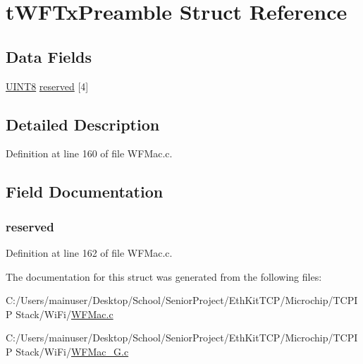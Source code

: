 \hypertarget{structt_w_f_tx_preamble}{}\section{t\+W\+F\+Tx\+Preamble Struct Reference}
\label{structt_w_f_tx_preamble}
\subsection*{Data Fields}
\begin{DoxyCompactItemize}
\item 
\hyperlink{_generic_type_defs_8h_ab27e9918b538ce9d8ca692479b375b6a}{U\+I\+N\+T8} \hyperlink{structt_w_f_tx_preamble_a990d26e96bfb188449f93656115b026a}{reserved} \mbox{[}4\mbox{]}
\end{DoxyCompactItemize}


\subsection{Detailed Description}


Definition at line 160 of file W\+F\+Mac.\+c.



\subsection{Field Documentation}
\hypertarget{structt_w_f_tx_preamble_a990d26e96bfb188449f93656115b026a}{}
\subsubsection[{reserved}]{ reserved}\label{structt_w_f_tx_preamble_a990d26e96bfb188449f93656115b026a}


Definition at line 162 of file W\+F\+Mac.\+c.



The documentation for this struct was generated from the following files\+:\begin{DoxyCompactItemize}
\item 
C\+:/\+Users/mainuser/\+Desktop/\+School/\+Senior\+Project/\+Eth\+Kit\+T\+C\+P/\+Microchip/\+T\+C\+P\+I\+P Stack/\+Wi\+Fi/\hyperlink{_w_f_mac_8c}{W\+F\+Mac.\+c}\item 
C\+:/\+Users/mainuser/\+Desktop/\+School/\+Senior\+Project/\+Eth\+Kit\+T\+C\+P/\+Microchip/\+T\+C\+P\+I\+P Stack/\+Wi\+Fi/\hyperlink{_w_f_mac__24_g_8c}{W\+F\+Mac\+\_\+G.\+c}\end{DoxyCompactItemize}
